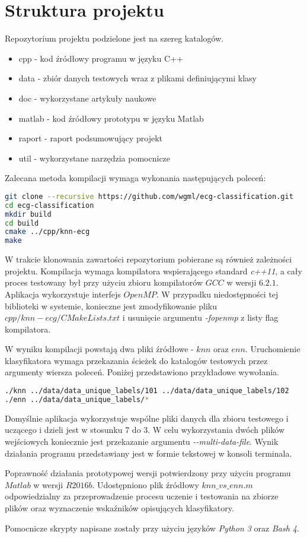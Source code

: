\section{Struktura projektu}
Repozytorium projektu podzielone jest na szereg katalogów.
\begin{itemize}  
	\item cpp - kod źródłowy programu w języku C++ 
	\item data - zbiór danych testowych wraz z plikami definiującymi klasy
	\item doc - wykorzystane artykuły naukowe
	\item matlab - kod źródłowy prototypu w języku Matlab
	\item raport - raport podsumowujący projekt
	\item util - wykorzystane narzędzia pomocnicze
\end{itemize}


Zalecana metoda kompilacji wymaga wykonania następujących poleceń:
\begin{lstlisting}[language=bash,caption=Kompilacja programu]
git clone --recursive https://github.com/wgml/ecg-classification.git
cd ecg-classification
mkdir build
cd build
cmake ../cpp/knn-ecg
make
\end{lstlisting}

W trakcie klonowania zawartości repozytorium pobierane są również zależności projektu. Kompilacja wymaga kompilatora wspierającego standard \textit{c++11}, a cały proces testowany był przy użyciu zbioru kompilatorów $GCC$ w wersji $6.2.1$. Aplikacja wykorzystuje interfejs $OpenMP$. W przypadku niedostępności tej biblioteki w systemie, konieczne jest zmodyfikowanie pliku $cpp/knn-ecg/CMakeLists.txt$ i usunięcie argumentu \textit{-fopenmp} z listy flag kompilatora.

W wyniku kompilacji powstają dwa pliki źródłowe - $knn$ oraz $enn$.
Uruchomienie klasyfikatora wymaga przekazania ścieżek do katalogów testowych przez argumenty wiersza poleceń. Poniżej przedstawiono przykładowe wywołania.

\begin{lstlisting}[language=bash,caption=Uruchamianie aplikacji]
./knn ../data/data_unique_labels/101 ../data/data_unique_labels/102
./enn ../data/data_unique_labels/*
\end{lstlisting}

Domyślnie aplikacja wykorzystuje wspólne pliki danych dla zbioru testowego i uczącego i dzieli jest w stosunku 7 do 3. W celu wykorzystania dwóch plików wejściowych koniecznie jest przekazanie argumentu \textit{\--\--multi-data-file}.
Wynik działania programu przedstawiany jest w formie tekstowej w konsoli terminala.

Poprawność działania prototypowej wersji potwierdzony przy użyciu programu $Matlab$ w wersji $R2016b$. Udostępniono plik źródłowy $knn\_vs\_enn.m$ odpowiedzialny za przeprowadzenie procesu uczenie i testowania na zbiorze plików oraz wyznaczenie wskaźników opisujących klasyfikatory.

Pomocnicze skrypty napisane zostały przy użyciu języków \textit{Python 3} oraz \textit{Bash 4}.